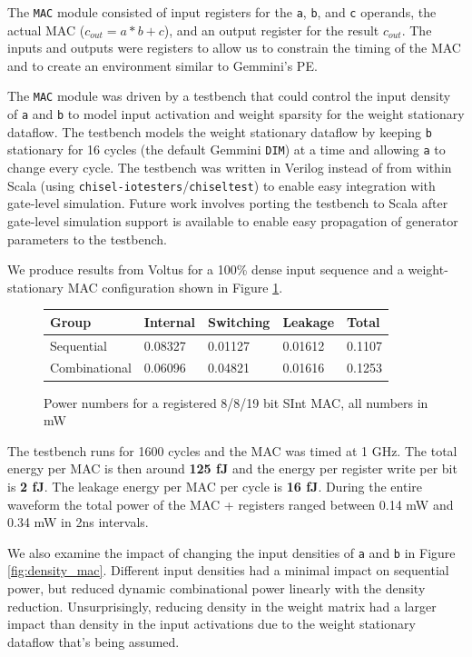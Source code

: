 \documentclass[sigconf]{acmart}
\begin{document}
The \texttt{MAC} module consisted of input registers for the \texttt{a}, \texttt{b}, and \texttt{c} operands, the actual MAC ($c_{out} = a*b + c$), and an output register for the result $c_{out}$.
The inputs and outputs were registers to allow us to constrain the timing of the MAC and to create an environment similar to Gemmini's PE.

The \texttt{MAC} module was driven by a testbench that could control the input density of \texttt{a} and \texttt{b} to model input activation and weight sparsity for the weight stationary dataflow.
The testbench models the weight stationary dataflow by keeping \texttt{b} stationary for 16 cycles (the default Gemmini \texttt{DIM}) at a time and allowing \texttt{a} to change every cycle.
The testbench was written in Verilog instead of from within Scala (using \texttt{chisel-iotesters}/\texttt{chiseltest}) to enable easy integration with gate-level simulation.
Future work involves porting the testbench to Scala after gate-level simulation support is available to enable easy propagation of generator parameters to the testbench.

We produce results from Voltus for a 100\% dense input sequence and a weight-stationary MAC configuration shown in Figure \ref{fig:mac_energy}.

\begin{figure}
\begin{tabular}{l l l l l}
  \textbf{Group} & \textbf{Internal} & \textbf{Switching} & \textbf{Leakage} & \textbf{Total} \\
  \toprule
  Sequential & 0.08327 & 0.01127 & 0.01612 & 0.1107 \\ \midrule
  Combinational & 0.06096 & 0.04821 & 0.01616 & 0.1253 \\
  \bottomrule
\end{tabular}
\caption{Power numbers for a registered 8/8/19 bit SInt MAC, all numbers in mW}
\label{fig:mac_energy}
\end{figure}

The testbench runs for 1600 cycles and the MAC was timed at 1 GHz.
The total energy per MAC is then around \textbf{125 fJ} and the energy per register write per bit is \textbf{2 fJ}.
The leakage energy per MAC per cycle is \textbf{16 fJ}.
During the entire waveform the total power of the MAC + registers ranged between 0.14 mW and 0.34 mW in 2ns intervals.

We also examine the impact of changing the input densities of \texttt{a} and \texttt{b} in Figure \ref{fig:density_mac}.
Different input densities had a minimal impact on sequential power, but reduced dynamic combinational power linearly with the density reduction.
Unsurprisingly, reducing density in the weight matrix had a larger impact than density in the input activations due to the weight stationary dataflow that's being assumed.
\end{document}
